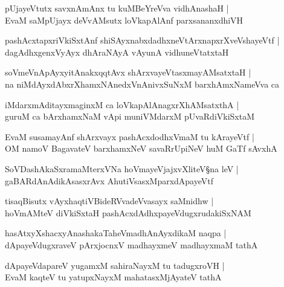 \begin{shloka}
pUjayeVtutx savxnAmAnx tu kuMBeYreVva vidhAnashaH |\\
EvaM saMpUjayx deVvAMsutx loVkapAlAnf parxsananxdhiVH 
\end{shloka}

\begin{shloka}
pashAcxtapxriVkiSxtAnf shiSAyxnabxdadhxneVtArxnapxrXveVshayeVtf |\\
dagAdhxgenxVyAyx dhAraNAyA vAyunA vidhuneVtatxtaH 
\end{shloka}

\begin{shloka}
soVmeVnApAyxyitAnakxqqtAvx shArxvayeVtasxmayAMsatxtaH |\\
na niMdAyxdAbxrXhamxNAnedxVnAnivxSuNxM barxhAmxNameVva ca 
\end{shloka}

\begin{shloka}
iMdarxmAditayxmaginxM ca loVkapAlAnagxrXhAMsatxthA |\\
guruM ca bArxhamxNaM vApi muniVMdarxM pUvaRdiVkiSxtaM 
\end{shloka}

\begin{shloka}
EvaM susamayAnf shArxvayx pashAcxdodhxVmaM tu kArayeVtf |\\
OM namoV BagavateV barxhamxNeV savaRrUpiNeV huM GaTf sAvxhA 
\end{shloka}

\begin{shloka}
SoVDashAkaSxramaMterxVNa hoVmayeVjajxvXliteV\S na leV |\\
gaBARdAnAdikAsasxrAvx AhutiVsasxMparxdApayeVtf 
\end{shloka}

\begin{shloka}
tisaqBisutx vAyxhaqtiVBideRVvadeVvasayx saMnidhw |\\
hoVmAMteV diVkiSxtaH pashAcxdAdhxpayeVdugxrudakiSxNAM 
\end{shloka}

\begin{shloka}
hasAtxyXshacxyAnashakaTaheVmadhAnAyxdikaM naqpa |\\
dApayeVdugxraveV pArxjocnxV madhayxmeV madhayxmaM tathA 
\end{shloka}

\begin{shloka}
dApayeVdapareV yugamxM sahiraNayxM tu tadugxroVH |\\
EvaM kaqteV tu yatupxNayxM mahatasxMjAyateV tathA
\end{shloka}

